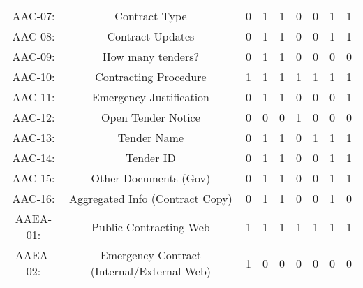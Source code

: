 \documentclass[a4paper, twoside]{report}
\begin{document}
\begin{table}[htbp]
\begin{adjustbox}{max width=\linewidth}
\begin{tabular}{rcccccccc}
    \multicolumn{1}{c}{AAC-07:} & \multicolumn{1}{p{19em}}{Contract Type} & 0     & 1     & 1     & 0     & 0     & 1     & 1 \\
    \multicolumn{1}{c}{AAC-08:} & \multicolumn{1}{p{19em}}{Contract Updates} & 0     & 1     & 1     & 0     & 0     & 1     & 1 \\
    \multicolumn{1}{c}{AAC-09:} & \multicolumn{1}{p{19em}}{How many tenders?} & 0     & 1     & 1     & 0     & 0     & 0     & 0 \\
    \multicolumn{1}{c}{AAC-10:} & \multicolumn{1}{p{19em}}{\cellcolor[rgb]{ .749,  .749,  .749}Contracting Procedure} & \cellcolor[rgb]{ .749,  .749,  .749}1 & \cellcolor[rgb]{ .749,  .749,  .749}1 & \cellcolor[rgb]{ .749,  .749,  .749}1 & \cellcolor[rgb]{ .749,  .749,  .749}1 & \cellcolor[rgb]{ .749,  .749,  .749}1 & \cellcolor[rgb]{ .749,  .749,  .749}1 & \cellcolor[rgb]{ .749,  .749,  .749}1 \\
    \multicolumn{1}{c}{AAC-11:} & \multicolumn{1}{p{19em}}{\cellcolor[rgb]{ .749,  .749,  .749}Emergency Justification} & \cellcolor[rgb]{ .749,  .749,  .749}0 & \cellcolor[rgb]{ .749,  .749,  .749}1 & \cellcolor[rgb]{ .749,  .749,  .749}1 & \cellcolor[rgb]{ .749,  .749,  .749}0 & \cellcolor[rgb]{ .749,  .749,  .749}0 & \cellcolor[rgb]{ .749,  .749,  .749}0 & \cellcolor[rgb]{ .749,  .749,  .749}1 \\
    \multicolumn{1}{c}{AAC-12:} & \multicolumn{1}{p{19em}}{Open Tender Notice} & 0     & 0     & 0     & 1     & 0     & 0     & 0 \\
    \multicolumn{1}{c}{AAC-13:} & \multicolumn{1}{p{19em}}{Tender Name} & 0     & 1     & 1     & 0     & 1     & 1     & 1 \\
    \multicolumn{1}{c}{AAC-14:} & \multicolumn{1}{p{19em}}{Tender ID} & 0     & 1     & 1     & 0     & 0     & 1     & 1 \\
    \multicolumn{1}{c}{AAC-15:} & \multicolumn{1}{p{19em}}{Other Documents (Gov)} & 0     & 1     & 1     & 0     & 0     & 1     & 1 \\
    \multicolumn{1}{c}{AAC-16:} & \multicolumn{1}{p{19em}}{Aggregated Info (Contract Copy)} & 0     & 1     & 1     & 0     & 0     & 1     & 0 \\
    \midrule
    \multicolumn{1}{c}{AAEA-01:} & \multicolumn{1}{p{19em}}{Public Contracting Web} & 1     & 1     & 1     & 1     & 1     & 1     & 1 \\
    \multicolumn{1}{c}{AAEA-02:} & \multicolumn{1}{p{19em}}{\cellcolor[rgb]{ .749,  .749,  .749}Emergency Contract (Internal/External Web)} & \cellcolor[rgb]{ .749,  .749,  .749}1 & \cellcolor[rgb]{ .749,  .749,  .749}0 & \cellcolor[rgb]{ .749,  .749,  .749}0 & \cellcolor[rgb]{ .749,  .749,  .749}0 & \cellcolor[rgb]{ .749,  .749,  .749}0 & \cellcolor[rgb]{ .749,  .749,  .749}0 & \cellcolor[rgb]{ .749,  .749,  .749}0 \\

\end{tabular}
\end{adjustbox}
\end{table}
\end{document}
